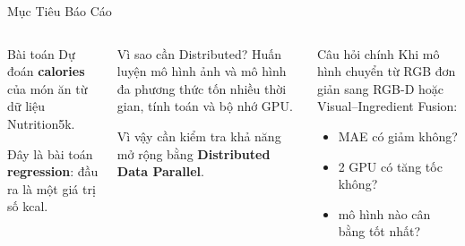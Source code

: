 \documentclass[10pt,aspectratio=169]{beamer}
\newcommand{\kw}[1]{\textcolor{uitblue}{\bfseries #1}}
\begin{document}
\begin{frame}{Mục Tiêu Báo Cáo}
\scriptsize
\begin{columns}[T]
\begin{uitbox}{Bài toán}
Dự đoán \kw{calories} của món ăn từ dữ liệu Nutrition5k.

\vspace{0.08cm}
Đây là bài toán \kw{regression}: đầu ra là một giá trị số kcal.
\end{uitbox}

\begin{accentbox}{Vì sao cần Distributed?}
Huấn luyện mô hình ảnh và mô hình đa phương thức tốn nhiều thời gian, tính toán và bộ nhớ GPU.

\vspace{0.08cm}
Vì vậy cần kiểm tra khả năng mở rộng bằng \kw{Distributed Data Parallel}.
\end{accentbox}

\begin{greenbox}{Câu hỏi chính}
Khi mô hình chuyển từ RGB đơn giản sang RGB-D hoặc Visual--Ingredient Fusion:

\vspace{0.05cm}
\begin{itemize}
  \item MAE có giảm không?
  \item 2 GPU có tăng tốc không?
  \item mô hình nào cân bằng tốt nhất?
\end{itemize}
\end{greenbox}
\end{columns}
\end{frame}
\end{document}
